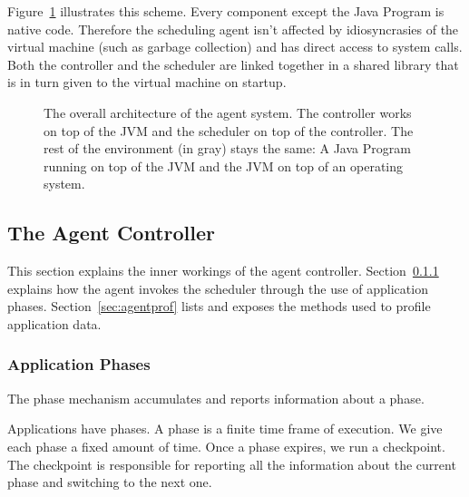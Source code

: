 Figure~\ref{fig:agentsystem} illustrates this scheme. Every component except the Java Program is native code. Therefore the scheduling agent isn't affected by idiosyncrasies of the virtual machine (such as garbage collection) and has direct access to system calls. Both the controller and the scheduler are linked together in a shared library that is in turn given to the virtual machine on startup.

\begin{figure} \label{fig:agentsystem}
\centering
{}
\caption{The overall architecture of the agent system. The controller works on top of the JVM and the scheduler on top of the controller. The rest of the environment (in gray) stays the same: A Java Program running on top of the JVM and the JVM on top of an operating system.}
\end{figure}

\subsection{The Agent Controller}

This section explains the inner workings of the agent controller. Section~\ref{sec:agentphases} explains how the agent invokes the scheduler through the use of application phases. Section~\ref{sec:agentprof} lists and exposes the methods used to profile application data.

\subsubsection{Application Phases} \label{sec:agentphases}

The phase mechanism accumulates and reports information about a phase.

Applications have phases. A phase is a finite time frame of execution. We give each phase a fixed amount of time. Once a phase expires, we run a checkpoint. The checkpoint is responsible for reporting all the information about the current phase and switching to the next one.

